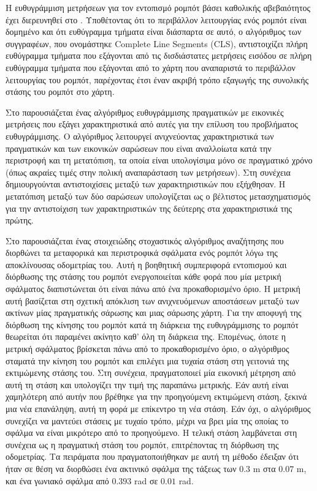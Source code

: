 Η ευθυγράμμιση μετρήσεων για τον εντοπισμό ρομπότ βάσει καθολικής αβεβαιότητος
έχει διερευνηθεί στο \cite{XuZezhong}. Υποθέτοντας ότι το περιβάλλον
λειτουργίας ενός ρομπότ είναι δομημένο και ότι ευθύγραμμα τμήματα είναι
διάσπαρτα σε αυτό, ο αλγόριθμος των συγγραφέων, που ονομάστηκε Complete Line
Segments (CLS), αντιστοιχίζει πλήρη ευθύγραμμα τμήματα που εξάγονται από τις
δισδιάστατες μετρήσεις εισόδου σε πλήρη ευθύγραμμα τμήματα που εξάγονται από το
χάρτη που αναπαριστά το περιβάλλον λειτουργίας του ρομπότ, παρέχοντας έτσι έναν
ακριβή τρόπο εξαγωγής της συνολικής στάσης του ρομπότ στο χάρτη.

Στο \cite{Lingemann2005a} παρουσιάζεται ένας αλγόριθμος ευθυγράμμισης
πραγματικών με εικονικές μετρήσεις που εξάγει χαρακτηριστικά από αυτές για την
επίλυση του προβλήματος ευθυγράμμισης.  Ο αλγόριθμος λειτουργεί ανιχνεύοντας
χαρακτηριστικά των πραγματικών και των εικονικών σαρώσεων που είναι αναλλοίωτα
κατά την περιστροφή και τη μετατόπιση, τα οποία είναι υπολογίσιμα μόνο σε
πραγματικό χρόνο (όπως ακραίες τιμές στην πολική αναπαράσταση των μετρήσεων).
Στη συνέχεια δημιουργούνται αντιστοιχίσεις μεταξύ των χαρακτηριστικών που
εξήχθησαν. Η μετατόπιση μεταξύ των δύο σαρώσεων υπολογίζεται ως ο βέλτιστος
μετασχηματισμός για την αντιστοίχιση των χαρακτηριστικών της δεύτερης στα
χαρακτηριστικά της πρώτης.

Στο \cite{Sandberg2009a} παρουσιάζεται ένας στοιχειώδης στοχαστικός αλγόριθμος
αναζήτησης που διορθώνει τα μεταφορικά και περιστροφικά σφάλματα ενός ρομπότ
λόγω της αποκλίνουσας οδομετρίας του. Αυτή η βοηθητική συμπεριφορά εντοπισμού
και διόρθωσης της στάσης του ρομπότ ενεργοποιείται κάθε φορά που μία μετρική
σφάλματος διαπιστώνεται ότι είναι πάνω από ένα προκαθορισμένο όριο. Η μετρική
αυτή βασίζεται στη σχετική απόκλιση των ανιχνευόμενων αποστάσεων μεταξύ των
ακτίνων μίας πραγματικής σάρωσης και μιας σάρωσης χάρτη. Για την αποφυγή της
διόρθωση της κίνησης του ρομπότ κατά τη διάρκεια της ευθυγράμμισης το ρομπότ
θεωρείται ότι παραμένει ακίνητο καθ' όλη τη διάρκεια της. Επομένως, όποτε η
μετρική σφάλματος βρίσκεται πάνω από το προκαθορισμένο όριο, ο αλγόριθμος
σταματά την κίνηση του ρομπότ και επιλέγει μια τυχαία στάση στη γειτονιά της
εκτιμώμενης στάσης του. Στη συνέχεια, πραγματοποιεί μία εικονική μέτρηση από
αυτή τη στάση και υπολογίζει την τιμή της παραπάνω μετρικής. Εάν αυτή είναι
χαμηλότερη από αυτήν που βρέθηκε για την προηγούμενη εκτιμώμενη στάση, ξεκινά
μια νέα επανάληψη, αυτή τη φορά με επίκεντρο τη νέα στάση. Εάν όχι, ο
αλγόριθμος συνεχίζει να μαντεύει στάσεις με τυχαίο τρόπο, μέχρι να βρει μία της
οποίας το σφάλμα να είναι μικρότερο από το προηγούμενο. Η τελική στάση
λαμβάνεται στη συνέχεια ως η πραγματική στάση του ρομπότ, επιτρέποντας τη
διόρθωση της οδομετρίας. Τα πειράματα που πραγματοποιήθηκαν με αυτή τη μέθοδο
έδειξαν ότι ήταν σε θέση να διορθώσει ένα ακτινικό σφάλμα της τάξεως των
$0.3$ m στα $0.07$ m, και ένα γωνιακό σφάλμα από $0.393$ rad σε $0.01$ rad.

